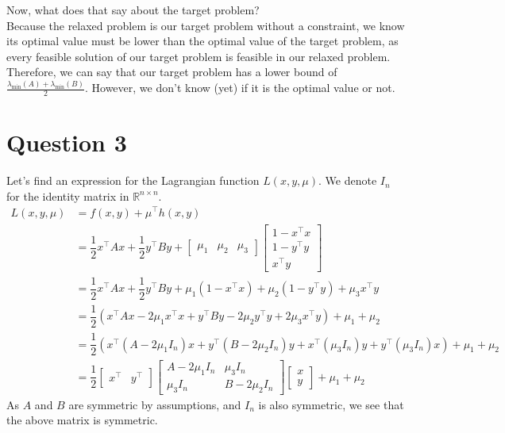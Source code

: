 \documentclass{article}
\newcommand{\R}{\mathbb{R}}
\newcommand{\tp}{^\top}
\newcommand{\fxy}{\dfrac{1}{2}x\tp A x + \dfrac{1}{2} y\tp B y}
\newcommand{\hxy}{\begin{bmatrix}
1-x\tp x\\
1-y\tp y\\
x\tp y
\end{bmatrix}}
\begin{document}
Now, what does that say about the target problem?\\
Because the relaxed problem is our target problem without a constraint, we know its optimal value must be lower than the optimal value of the target problem, as every feasible solution of our target problem is feasible in our relaxed problem. Therefore, we can say that our target problem has a lower bound of $\frac{\lambda_{\min} (A)+\lambda_{\min} (B)}{2}$. However, we don't know (yet) if it is the optimal value or not.

\section*{Question 3}
Let's find an expression for the Lagrangian function $L(x,y,\mu)$. We denote $I_n$ for the identity matrix in $\R^{n\times n}$.
\begin{align*}
L(x,y,\mu) &= f(x,y)+\mu\tp h(x,y) \\
&=\fxy  + \begin{bmatrix} \mu_1 &\mu_2 & \mu_3 \end{bmatrix} \hxy \\
&=\fxy + \mu_1(1-x\tp x) +\mu_2(1-y\tp y) + \mu_3 x\tp y \\
&= \dfrac{1}{2}\left(x\tp A x - 2\mu_1 x\tp x +  y\tp B y -2\mu_2 y\tp y + 2\mu_3 x\tp y\right) + \mu_1+\mu_2 \\
&= \dfrac{1}{2} \left(x\tp  \left( A - 2\mu_1 I_n \right) x +  y\tp \left( B -2\mu_2 I_n \right) y   + x\tp  \left( \mu_3 I_n \right) y+ y\tp \left( \mu_3 I_n \right) x \right) + \mu_1+\mu_2 \\
&= \dfrac{1}{2} \begin{bmatrix} x\tp & y\tp\end{bmatrix}
\begin{bmatrix} A-2\mu_1 I_n & \mu_3 I_n \\
\mu_3 I_n & B-2\mu_2 I_n \end{bmatrix}
\begin{bmatrix} x \\ y \end{bmatrix} +\mu_1+\mu_2 
\end{align*}
As $A$ and $B$ are symmetric by assumptions, and $I_n$ is also symmetric, we see that the above matrix is symmetric.
\end{document}
